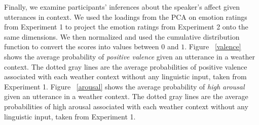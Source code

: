 \documentclass[10pt,letterpaper]{article}
\begin{document}
Finally, we examine participants' inferences about the speaker's affect given utterances in context. We used the loadings from the PCA on emotion ratings from Experiment 1 to project the emotion ratings from Experiment 2 onto the same dimensions. We then normalized and used the cumulative distribution function to convert the scores into values between $0$ and $1$. Figure ~\ref{valence} shows the average probability of \emph{positive valence} given an utterance in a weather context. The dotted gray lines are the average probabilities of positive valence associated with each weather context without any linguistic input, taken from Experiment 1. 
%
%
Figure ~\ref{arousal} shows the average probability of \emph{high arousal} given an utterance in a weather context. The dotted gray lines are the average probabilities of high arousal associated with each weather context without any linguistic input, taken from Experiment 1. 


%
\end{document}
